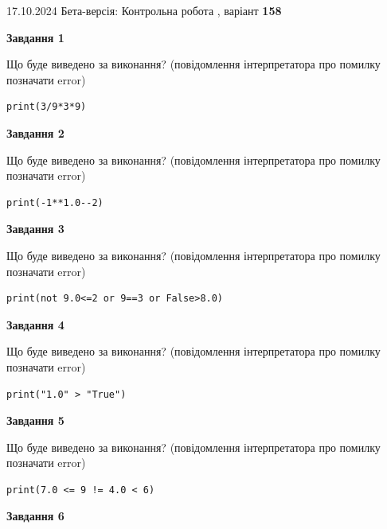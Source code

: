 \documentclass[12pt, ukrainian]{article}
\begin{document}
{\Large{17.10.2024 Бета-версія: Контрольна робота , варіант  \No \textbf { 158 }\par}}
{
\begin {large}
{\begin {center}\textbf{Завдання 1}\end {center}}

Що буде виведено за виконання? (повідомлення інтерпретатора про помилку позначати error)\par
\begin{verbatim}
print(3/9*3*9)
\end{verbatim}

{\begin {center}\textbf{Завдання 2}\end {center}}

Що буде виведено за виконання? (повідомлення інтерпретатора про помилку позначати error)\par
\begin{verbatim}
print(-1**1.0--2)
\end{verbatim}

{\begin {center}\textbf{Завдання 3}\end {center}}

Що буде виведено за виконання? (повідомлення інтерпретатора про помилку позначати error)\par
\begin{verbatim}
print(not 9.0<=2 or 9==3 or False>8.0)
\end{verbatim}

{\begin {center}\textbf{Завдання 4}\end {center}}

Що буде виведено за виконання? (повідомлення інтерпретатора про помилку позначати error)\par
\begin{verbatim}
print("1.0" > "True")
\end{verbatim}

{\begin {center}\textbf{Завдання 5}\end {center}}

Що буде виведено за виконання? (повідомлення інтерпретатора про помилку позначати error)\par
\begin{verbatim}
print(7.0 <= 9 != 4.0 < 6)
\end{verbatim}

{\begin {center}\textbf{Завдання 6}\end {center}}


\end{large}}
\end{document}
